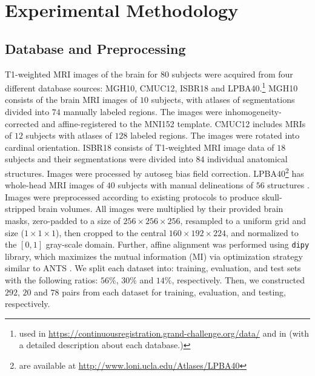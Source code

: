 \documentclass[preprint,authoryear]{elsarticle}
\begin{document}
\section{Experimental Methodology}\label{sec:measures}
\subsection{Database and Preprocessing}
T1-weighted MRI images of the brain for $80$ subjects were acquired from four different database sources: MGH10, CMUC12, ISBR18 and LPBA40.\footnote{used in \url{https://continuousregistration.grand-challenge.org/data/} and in \cite{klein2009evaluation} (with a detailed description about each database.)}
MGH10 consists of the brain MRI images of $10$ subjects, with atlases of segmentations divided into $74$ manually labeled regions. The images were inhomogeneity-corrected and affine-registered to the MNI152 template. CMUC12 includes MRIs of $12$ subjects with atlases of $128$ labeled regions. The images were rotated into cardinal orientation. ISBR18 consists of T1-weighted MRI image data of $18$ subjects and their segmentations were divided into $84$ individual anatomical structures. Images were processed by autoseg bias field correction. LPBA40\footnote{are available at \url{http://www.loni.ucla.edu/Atlases/LPBA40}} has whole-head MRI images of $40$ subjects with manual delineations of $56$ structures \cite{shattuck2008construction}. Images were preprocessed according to existing protocols to produce skull-stripped brain volumes.
All images were multiplied by their provided brain masks, zero-padded to a size of $256\times 256\times 256$, resampled to a uniform grid and size ($1\times1\times1$), then cropped to the central $160\times 192 \times 224$, and normalized to the $\left[0,1\right]$ gray-scale domain. Further, affine alignment was performed using \texttt{dipy} library, which maximizes the mutual information (MI) via optimization strategy similar to ANTS \cite{avants2011reproducible}.
We split each dataset into: training, evaluation, and test sets with the following ratios: $56\%$, $30\%$ and $14\%$, respectively.
Then, we constructed  $292$, $20$ and $78$ pairs from each dataset for training, evaluation, and testing, respectively.
\end{document}
